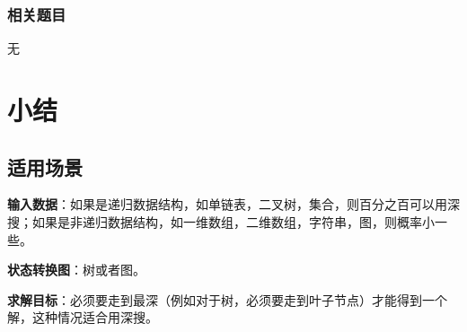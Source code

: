 \subsubsection{相关题目}
\begindot
\item 无
\myenddot


\section{小结} %
\label{sec:dfs-template}


\subsection{适用场景}

\textbf{输入数据}：如果是递归数据结构，如单链表，二叉树，集合，则百分之百可以用深搜；如果是非递归数据结构，如一维数组，二维数组，字符串，图，则概率小一些。

\textbf{状态转换图}：树或者图。

\textbf{求解目标}：必须要走到最深（例如对于树，必须要走到叶子节点）才能得到一个解，这种情况适合用深搜。


